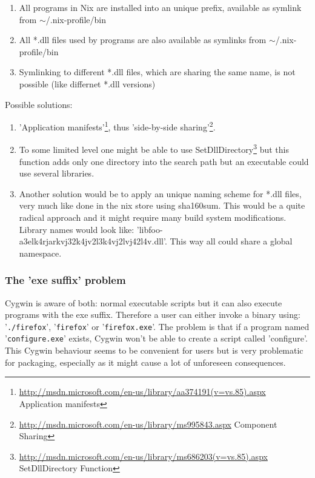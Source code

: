 \documentclass[a4paper,10pt]{article}
\begin{document}
\begin{enumerate}
 \item All programs in Nix are installed into an unique prefix, available as symlink from $\sim$/.nix-profile/bin
 \item All *.dll files used by programs are also available as symlinks from $\sim$/.nix-profile/bin
 \item Symlinking to different *.dll files, which are sharing the same name, is not possible (like differnet *.dll versions)
\end{enumerate}

Possible solutions:
\begin{enumerate}
 \item 'Application manifests'\footnote{\url{http://msdn.microsoft.com/en-us/library/aa374191(v=vs.85).aspx} Application manifests}, thus 'side-by-side sharing'\footnote{\url{http://msdn.microsoft.com/en-us/library/ms995843.aspx} Component Sharing}.
 \item To some limited level one might be able to use SetDllDirectory\footnote{\url{http://msdn.microsoft.com/en-us/library/ms686203(v=vs.85).aspx} SetDllDirectory Function} but this function adds only one directory into the search path but an executable could use several libraries. 
 \item Another solution would be to apply an unique naming scheme for *.dll files, very much like done in the nix store using sha160sum. This would be a quite radical approach and it might require many build system modifications. Library names would look like: 'libfoo-a3elk4rjarkvj32k4jv2l3k4vj2lvj42l4v.dll'. This way all could share a global namespace.
\end{enumerate}

\subsubsection*{The 'exe suffix' problem}
Cygwin is aware of both: normal executable scripts but it can also execute programs with the exe suffix. Therefore a user can either invoke a binary using: '\texttt{./firefox}', '\texttt{firefox}' or '\texttt{firefox.exe}'. The problem is that if a program named '\texttt{configure.exe}' exists, Cygwin won't be able to create a script called 'configure'. This Cygwin behaviour seems to be convenient for users but is very problematic for packaging, especially as it might cause a lot of unforeseen consequences. 
\end{document}
